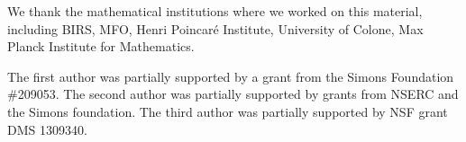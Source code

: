 We thank the mathematical institutions where we worked on this material,  including
BIRS, 
MFO, 
Henri Poincar\'{e} Institute,
University of Colone, 
Max Planck Institute for Mathematics. 

The first author was partially supported by a grant from the Simons Foundation \#209053.
The second author was partially supported by grants from NSERC and the Simons foundation.
The third author was partially supported by NSF grant DMS 1309340.

